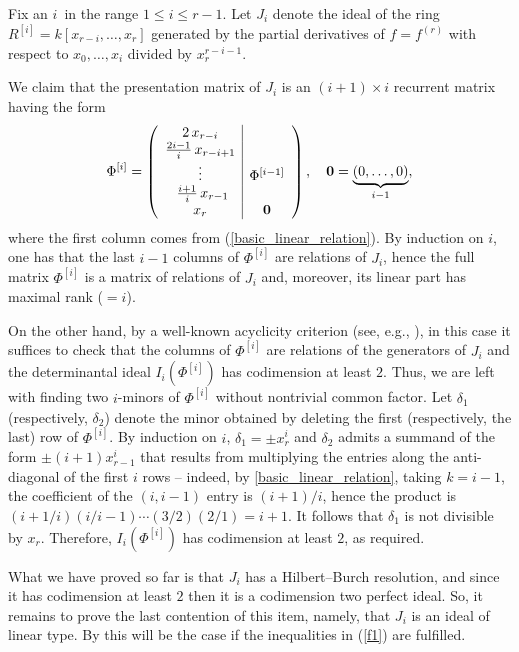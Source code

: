 \documentclass[11pt]{article}   %
\theoremstyle{definition}
\numberwithin{Theorem}{section} \numberwithin{equation}{section}
\begin{document}
{Fix an $i\,$ in the range $1\leq i\leq r-1$. Let $J_i$ denote the
ideal of the ring $R^{[i]}=k[x_{r-i},\ldots,x_{r}]$ generated by the
partial derivatives of $f=f^{(r)}$ with respect to $x_0,\ldots,x_i$
divided by $x_r^{r-i-1}$.


We claim that the presentation matrix of $J_i$ is an $(i+1)\times i$
recurrent matrix having the form
\begin{equation}\label{phi_i}
\Phi^{[i]}=\left(
\begin{array}{c|c}
\hbox{2}\, x_{r-i}&\\
\hbox{${\frac{2i-1}{i}}\, x_{r-i+1}$}&\\
\vdots&\Phi^{[i-1]}\\\
\hbox{$\frac{i+1}{i}\, x_{r-1}$}&\\
x_r&\mbox{{\boldmath $0$}}\end{array} \right), \quad \mbox{{\boldmath
$0$}}=\underbrace{(0,\ldots,0)}_{i-1},
\end{equation}
where the first column comes from (\ref{basic_linear_relation}).
 By induction on $i$, one has that the last
$i-1$ columns of $\Phi^{[i]}$ are relations of $J_i$, hence the full
matrix $\Phi^{[i]}$ is a matrix of relations of $J_i$ and, moreover,
its linear part has maximal rank ($=i$).

On the other hand, by a well-known acyclicity criterion (see, e.g.,
\cite{BE}), in this case it suffices to check that the columns of
$\Phi^{[i]}$ are relations of the generators of $J_i$ and the
determinantal ideal $I_i(\Phi^{[i]})$ has codimension at least $2$.
Thus, we are left with finding two $i$-minors of $\Phi^{[i]}$
without nontrivial common factor. Let $\delta_1$ (respectively,
$\delta_2$) denote the minor obtained by deleting the first
(respectively, the last) row of $\Phi^{[i]}$. By induction on $i$,
$\delta_1=\pm x_r^i$ and $\delta_2$ admits a summand of the form
$\pm (i+1) x_{r-1}^i$ that results from multiplying the entries
along the anti-diagonal of the first $i$ rows -- indeed, by
\eqref{basic_linear_relation}, taking $k=i-1$, the coefficient of
the $(i,i-1)$ entry is $(i+1)/i$, hence the product is
$(i+1/i)(i/i-1)\cdots (3/2)(2/1)=i+1$. It follows that $\delta_1$ is
not divisible by $x_r$. Therefore, $I_i(\Phi^{[i]})$ has codimension
at least $2$, as required.

What we have proved so far is that $J_i$ has a Hilbert--Burch
resolution, and since it has codimension at least $2$ then it is a
codimension two perfect ideal. So, it remains to prove the last
contention of this item, namely, that $J_i$ is an ideal of linear
type. By \cite[Corollary 1.4.2 and Theorem 3.1.6]{wolmer} this will
be the case if the inequalities in (\ref{f1}) are fulfilled.

}
\end{document}
